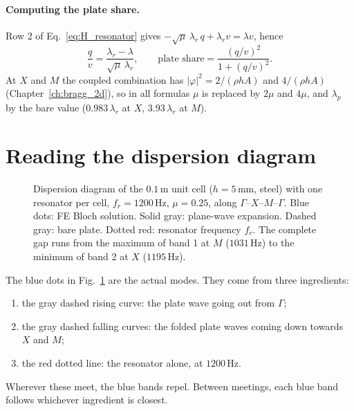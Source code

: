 \paragraph{Computing the plate share.}
Row 2 of Eq.~\eqref{eq:H_resonator} gives
$-\sqrt{\mu}\,\lambda_r\, q + \lambda_r v = \lambda v$, hence
\begin{equation}
  \frac{q}{v} = \frac{\lambda_r - \lambda}{\sqrt{\mu}\,\lambda_r},
  \qquad
  \text{plate share} = \frac{(q/v)^2}{1 + (q/v)^2} .
\end{equation}
At $X$ and $M$ the coupled combination has $|\varphi|^2 = 2/(\rho h A)$ and
$4/(\rho h A)$ (Chapter~\ref{ch:bragg_2d}), so in all formulas $\mu$ is
replaced by $2\mu$ and $4\mu$, and $\lambda_p$ by the bare value
($0.983\,\lambda_r$ at $X$, $3.93\,\lambda_r$ at $M$).

\section{Reading the dispersion diagram}

\begin{figure}[htbp]
  \centering
  \caption{Dispersion diagram of the $0.1\,\mathrm{m}$ unit cell
    ($h = 5\,\mathrm{mm}$, steel) with one resonator per cell,
    $f_r = 1200\,\mathrm{Hz}$, $\mu = 0.25$, along
    $\Gamma$--$X$--$M$--$\Gamma$. Blue dots: FE Bloch solution. Solid gray:
    plane-wave expansion. Dashed gray: bare plate. Dotted red: resonator
    frequency $f_r$. The complete gap runs from the maximum of band 1 at $M$
    ($1031\,\mathrm{Hz}$) to the minimum of band 2 at $X$
    ($1195\,\mathrm{Hz}$).}
  \label{fig:dispersion_vamm_1200}
\end{figure}

The blue dots in Fig.~\ref{fig:dispersion_vamm_1200} are the actual modes. They
come from three ingredients:
\begin{enumerate}
  \item the gray dashed rising curve: the plate wave going out from $\Gamma$;
  \item the gray dashed falling curves: the folded plate waves coming down
        towards $X$ and $M$;
  \item the red dotted line: the resonator alone, at $1200\,\mathrm{Hz}$.
\end{enumerate}
Wherever these meet, the blue bands repel. Between meetings, each blue band
follows whichever ingredient is closest.

